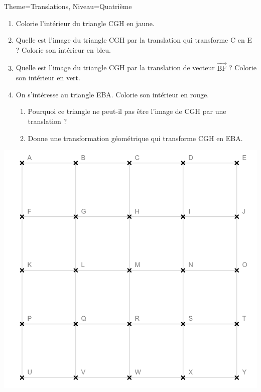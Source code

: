\documentclass[11pt]{article}
\begin{document}
\begin{Maquette}[Fiche]{Theme=Translations, Niveau=Quatrième}
\begin{multicols}{2}
\begin{exercice}
    \begin{enumerate}
        \item Colorie l’intérieur du triangle CGH en jaune.
        \item Quelle est l’image du triangle CGH par la translation qui transforme C en E ? Colorie son intérieur en bleu.
        \item Quelle est l’image du triangle CGH par la translation de vecteur $\overrightarrow{\textrm{BF}}$ ? Colorie son intérieur en vert.
        \item On s’intéresse au triangle EBA. Colorie son intérieur en rouge.
            \begin{enumerate}[label=\textbf{\alph*.}]
                \item Pourquoi ce triangle ne peut-il pas être l’image de CGH par une translation ?
                \item Donne une transformation géométrique qui transforme CGH en EBA.
            \end{enumerate}
    \end{enumerate}
\end{exercice}

\columnbreak

\begin{exercice}
    \includegraphics[width=\linewidth]{Images/exercice5.png}


\end{exercice}
\end{multicols}
\end{Maquette}
\end{document}
